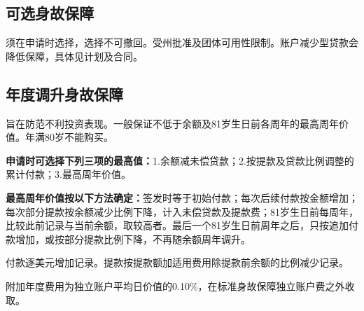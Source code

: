 \documentclass[UTF8,fontset=none,11pt,a4paper]{ctexart}
\begin{document}
\subsection*{可选身故保障}
须在申请时选择，选择不可撤回。受州批准及团体可用性限制。账户减少型贷款会降低保障，具体见计划及合同。


\subsection*{年度调升身故保障}
旨在防范不利投资表现。一般保证不低于余额及81岁生日前各周年的最高周年价值。年满80岁不能购买。


\textbf{申请时可选择下列三项的最高值：}1.余额减未偿贷款；2.按提款及贷款比例调整的累计付款；3.最高周年价值。


\textbf{最高周年价值按以下方法确定：}签发时等于初始付款；每次后续付款按金额增加；每次部分提款按余额减少比例下降，计入未偿贷款及提款费；81岁生日前每周年，比较此前记录与当前余额，取较高者。最后一个81岁生日前周年之后，只按追加付款增加，或按部分提款比例下降，不再随余额周年调升。


付款逐美元增加记录。提款按提款额加适用费用除提款前余额的比例减少记录。


附加年度费用为独立账户平均日价值的0.10\%，在标准身故保障独立账户费之外收取。
\end{document}
